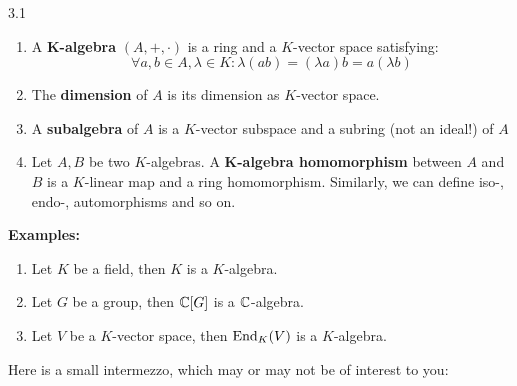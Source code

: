 \documentclass[twoside = false,	%
		headsepline,		%
		parskip = true,
		]{scrbook}						%
\begin{document}
        \begin{definition}{}{3.1}
            \begin{enumerate}
                \item
                    A $\mathbf{K}$\textbf{-algebra} $(A,+,\cdot)$ is a ring and a $K$-vector space satisfying:
                    \begin{equation*}
                        \forall a,b \in A, \lambda \in K: \lambda(ab) = (\lambda a)b = a (\lambda b)
                    \end{equation*}
                \item
                    The \textbf{dimension} of $A$ is its dimension as $K$-vector space.
                \item 
                    A \textbf{subalgebra} of $A$ is a $K$-vector subspace and a subring (not an ideal!) of $A$
                \item
                    Let $A,B$ be two $K$-algebras. A $\mathbf{K}$\textbf{-algebra homomorphism} between $A$ and $B$ is a $K$-linear map and a ring homomorphism. Similarly, we can define iso-, endo-, automorphisms and so on.
            \end{enumerate}
        \end{definition}
        
        \textbf{Examples:}
            \begin{enumerate}
                \item
                    Let $K$ be a field, then $K$ is a $K$-algebra.
                \item
                    Let $G$ be a group, then $\mathbb C[G]$ is a $\mathbb C$-algebra.
                \item
                    Let $V$ be a $K$-vector space, then $\mathrm{End}_K(V)$ is a $K$-algebra.
            \end{enumerate}

        Here is a small intermezzo, which may or may not be of interest to you:
        
\end{document}
